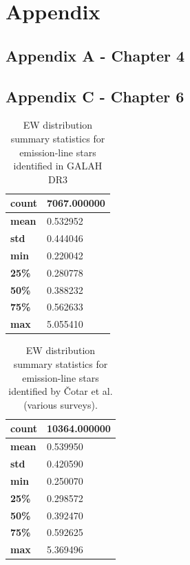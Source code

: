 \chapter{Appendix}

\section{Appendix A - Chapter 4}

\section{Appendix C - Chapter 6}

\begin{table}[!htb]
\begin{center}
\begin{tabular}{|l|l|}
\hline
\textbf{count} & 7067.000000 \\ \hline
\textbf{mean} & 0.532952 \\ \hline
\textbf{std} & 0.444046 \\ \hline
\textbf{min} & 0.220042 \\ \hline
\textbf{25\%} & 0.280778 \\ \hline
\textbf{50\%} & 0.388232 \\ \hline
\textbf{75\%} & 0.562633 \\ \hline
\textbf{max} & 5.055410 \\ \hline
\end{tabular}
\caption{EW distribution summary statistics for emission-line stars identified in GALAH DR3}
\label{table:draglift1}
\end{center}
\end{table}

\begin{table}[!htb]
\begin{center}
\begin{tabular}{|l|l|}
\hline
\textbf{count} & 10364.000000 \\ \hline
\textbf{mean} & 0.539950 \\ \hline
\textbf{std} & 0.420590 \\ \hline
\textbf{min} & 0.250070 \\ \hline
\textbf{25\%} & 0.298572 \\ \hline
\textbf{50\%} & 0.392470 \\ \hline
\textbf{75\%} & 0.592625 \\ \hline
\textbf{max} & 5.369496 \\ \hline
\end{tabular}
\caption{EW distribution summary statistics for emission-line stars identified by Čotar et al. (various surveys).}
\label{table:draglift1}
\end{center}
\end{table}

